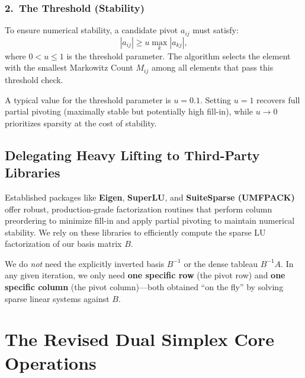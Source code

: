 \documentclass[11pt, a4paper]{article}
\begin{document}
\subsubsection*{2.\ The Threshold (Stability)}

To ensure numerical stability, a candidate pivot $a_{ij}$ must satisfy:
\[
|a_{ij}| \ge u \max_{k}|a_{kj}|,
\]
where $0 < u \le 1$ is the threshold parameter. The algorithm selects the element with the smallest Markowitz Count $M_{ij}$ among all elements that pass this threshold check.

\begin{note}
A typical value for the threshold parameter is $u = 0.1$. Setting $u = 1$ recovers full partial pivoting (maximally stable but potentially high fill-in), while $u \to 0$ prioritizes sparsity at the cost of stability.
\end{note}

\subsection{Delegating Heavy Lifting to Third-Party Libraries}

Established packages like \textbf{Eigen}, \textbf{SuperLU}, and \textbf{SuiteSparse (UMFPACK)} offer robust, production-grade factorization routines that perform column preordering to minimize fill-in and apply partial pivoting to maintain numerical stability. We rely on these libraries to efficiently compute the sparse LU factorization of our basis matrix $B$.

\begin{note}
We do \emph{not} need the explicitly inverted basis $B^{-1}$ or the dense tableau $B^{-1}A$. In any given iteration, we only need \textbf{one specific row} (the pivot row) and \textbf{one specific column} (the pivot column)---both obtained ``on the fly'' by solving sparse linear systems against $B$.
\end{note}

\section{The Revised Dual Simplex Core Operations}
\end{document}

